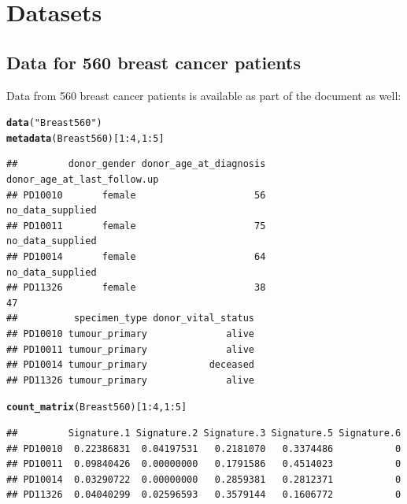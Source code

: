 \documentclass{article}\usepackage[]{graphicx}\usepackage[]{color}
\makeatletter
\newcommand{\hlnum}[1]{\textcolor[rgb]{0.686,0.059,0.569}{#1}}%
\newcommand{\hlstr}[1]{\textcolor[rgb]{0.192,0.494,0.8}{#1}}%
\newcommand{\hlopt}[1]{\textcolor[rgb]{0,0,0}{#1}}%
\newcommand{\hlstd}[1]{\textcolor[rgb]{0.345,0.345,0.345}{#1}}%
\newcommand{\hlkwd}[1]{\textcolor[rgb]{0.737,0.353,0.396}{\textbf{#1}}}%
\newenvironment{kframe}{%
 \def\at@end@of@kframe{}%
 \ifinner\ifhmode%
  \def\at@end@of@kframe{\end{minipage}}%
  \begin{minipage}{\columnwidth}%
 \fi\fi%
 \def\FrameCommand##1{\hskip\@totalleftmargin \hskip-\fboxsep
 \colorbox{shadecolor}{##1}\hskip-\fboxsep
     \hskip-\linewidth \hskip-\@totalleftmargin \hskip\columnwidth}%
 \MakeFramed {\advance\hsize-\width
   \@totalleftmargin\z@ \linewidth\hsize
   \@setminipage}}%
 {\par\unskip\endMakeFramed%
 \at@end@of@kframe}
\newenvironment{knitrout}{}{} %
\makeatother
\begin{document}
\section{Datasets}
\subsection{Data for 560 breast cancer patients}
Data from 560 breast cancer patients is available as part of the document as well:

\begin{knitrout}
\color{fgcolor}\begin{kframe}
\begin{alltt}
\hlkwd{data}\hlstd{(}\hlstr{"Breast560"}\hlstd{)}
\hlkwd{metadata}\hlstd{(Breast560)[}\hlnum{1}\hlopt{:}\hlnum{4}\hlstd{,}\hlnum{1}\hlopt{:}\hlnum{5}\hlstd{]}
\end{alltt}
\begin{verbatim}
##         donor_gender donor_age_at_diagnosis donor_age_at_last_follow.up
## PD10010       female                     56            no_data_supplied
## PD10011       female                     75            no_data_supplied
## PD10014       female                     64            no_data_supplied
## PD11326       female                     38                          47
##          specimen_type donor_vital_status
## PD10010 tumour_primary              alive
## PD10011 tumour_primary              alive
## PD10014 tumour_primary           deceased
## PD11326 tumour_primary              alive
\end{verbatim}
\begin{alltt}
\hlkwd{count_matrix}\hlstd{(Breast560)[}\hlnum{1}\hlopt{:}\hlnum{4}\hlstd{,}\hlnum{1}\hlopt{:}\hlnum{5}\hlstd{]}
\end{alltt}
\begin{verbatim}
##         Signature.1 Signature.2 Signature.3 Signature.5 Signature.6
## PD10010  0.22386831  0.04197531   0.2181070   0.3374486           0
## PD10011  0.09840426  0.00000000   0.1791586   0.4514023           0
## PD10014  0.03290722  0.00000000   0.2859381   0.2812371           0
## PD11326  0.04040299  0.02596593   0.3579144   0.1606772           0
\end{verbatim}
\end{kframe}
\end{knitrout}
\end{document}
